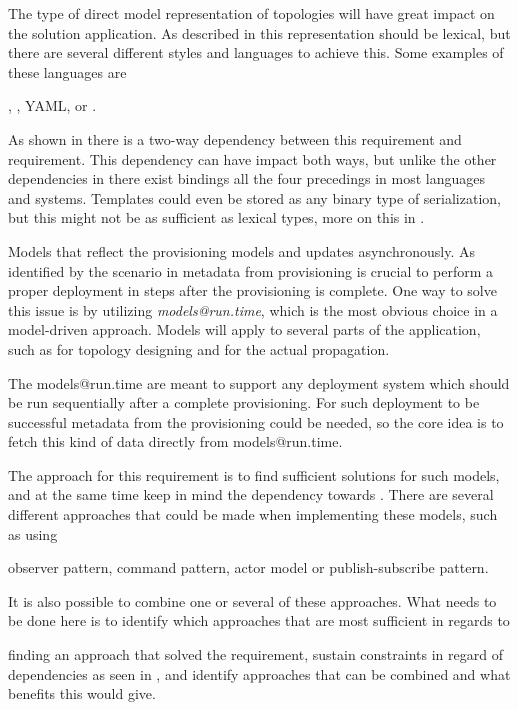 The type of direct model representation of topologies will have great impact 
on the solution application.
As described in  this representation should be lexical,
but there are several different styles and languages to achieve this.
Some examples of these languages are 
\begin{ii}
  \iitem {},
  \iitem {},
  \iitem YAML,
  \iitem {} or
  \iitem {}.
\end{ii}
As shown in  there is a two-way dependency between 
this requirement and  requirement.
This dependency can have impact both ways, but unlike the other dependencies in
 there exist bindings all the four precedings in
most languages and systems.
Templates could even be stored as any binary type of serialization, 
but this might not be as sufficient as lexical types, more on this
in .

Models that reflect the provisioning models and updates asynchronously. 
As identified by the scenario in  metadata from provisioning is crucial to perform
a proper deployment in steps after the provisioning is complete.
One way to solve this issue is by utilizing \emph{models@run.time}, which is the most obvious choice in a
model-driven approach.
Models will apply to several parts of the application, such as for topology designing and for the actual propagation.

The models@run.time are meant to support any deployment system which should
be run sequentially after a complete provisioning.
For such deployment to be successful metadata from the provisioning could be needed,
so the core idea is to fetch this kind of data directly from models@run.time.

The approach for this requirement is to find sufficient solutions for such models,
and at the same time keep in mind the dependency towards .
There are several different approaches that could be made when implementing 
these models, such as using
\begin{ii}
  \iitem observer pattern,
  \iitem command pattern,
  \iitem actor model or
  \iitem publish-subscribe pattern.
\end{ii}
It is also possible to combine one or several of these approaches.
What needs to be done here is to identify which approaches that are most sufficient 
in regards to 
\begin{ii} 
  \iitem finding an approach that solved the requirement,
  \iitem sustain constraints in regard of dependencies as seen in , and
  \iitem identify approaches that can be combined and what benefits this would give.
\end{ii} 

